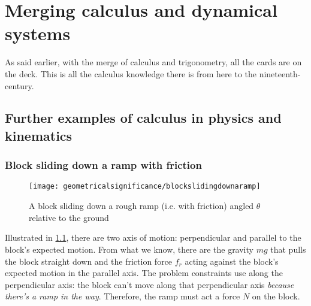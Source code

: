 \chapter{Merging calculus and dynamical systems}
\label{sec:calculus-and-physical-systems}

As said earlier, with the merge of calculus and trigonometry, all the cards are on the deck. This is all the calculus knowledge there is from here to the nineteenth-century.

\section{Further examples of calculus in physics and kinematics}

\subsection{Block sliding down a ramp with friction}

\begin{figure}[ht]
    \centering
    \texttt{[image: geometricalsignificance/blockslidingdownaramp]}
    \caption{A block sliding down a rough ramp (i.e. with friction) angled $\theta$ relative to the ground}
    \label{fig:blockslidingdownaramp}
\end{figure}
Illustrated in \cref{fig:blockslidingdownaramp}, there are two axis of motion: perpendicular and parallel to the block's expected motion. From what we know, there are the gravity $mg$ that pulls the block straight down and the friction force $f_r$ acting against the block's expected motion in the parallel axis. The problem constraints use along the perpendicular axis: the block can't move along that perpendicular axis \emph{because there's a ramp in the way}. Therefore, the ramp must act a force $N$ on the block.


